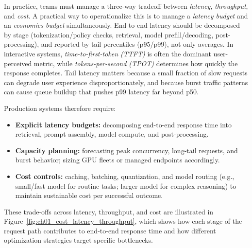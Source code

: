 In practice, teams must manage a three-way tradeoff between \emph{latency}, \emph{throughput}, and \emph{cost}. A practical way to operationalize this is to manage a \emph{latency budget} and an \emph{economics budget} simultaneously. End-to-end latency should be decomposed by stage (tokenization/policy checks, retrieval, model prefill/decoding, post-processing), and reported by tail percentiles (p95/p99), not only averages. In interactive systems, \emph{time-to-first-token (TTFT)} is often the dominant user-perceived metric, while \emph{tokens-per-second (TPOT)} determines how quickly the response completes. Tail latency matters because a small fraction of slow requests can degrade user experience disproportionately, and because burst traffic patterns can cause queue buildup that pushes p99 latency far beyond p50.

Production systems therefore require:
\begin{itemize}
  \item \textbf{Explicit latency budgets:} decomposing end-to-end response time into retrieval, prompt assembly, model compute, and post-processing.
  \item \textbf{Capacity planning:} forecasting peak concurrency, long-tail requests, and burst behavior; sizing GPU fleets or managed endpoints accordingly.
  \item \textbf{Cost controls:} caching, batching, quantization, and model routing (e.g., small/fast model for routine tasks; larger model for complex reasoning) to maintain sustainable cost per successful outcome.
\end{itemize}

These trade-offs across latency, throughput, and cost are illustrated in Figure~\ref{fig:ch01_cost_latency_throughput}, which shows how each stage of the request path contributes to end-to-end response time and how different optimization strategies target specific bottlenecks.


